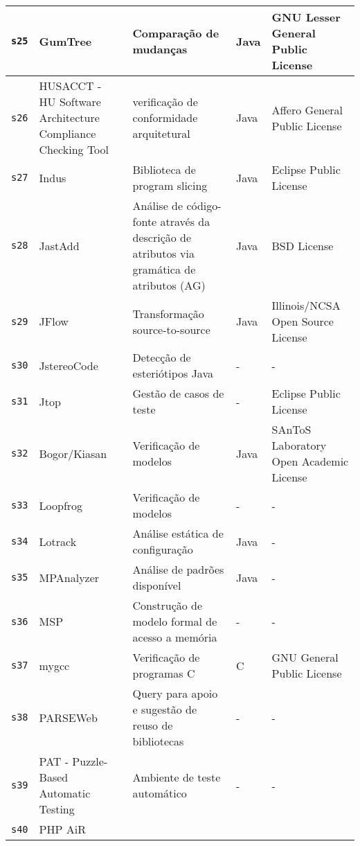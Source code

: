 \begin{longtable}{| l | p{4.5cm} | p{7cm} | p{2.5cm} | p{2.5cm} |}
    \texttt{s25} &
      GumTree &
      Comparação de mudanças &
      Java &
      GNU Lesser General Public License \\
    \hline
    \texttt{s26} &
      HUSACCT - HU Software Architecture Compliance Checking Tool &
      verificação de conformidade arquitetural &
      Java &
      Affero General Public License \\
    \hline
    \texttt{s27} &
      Indus &
      Biblioteca de program slicing &
      Java &
      Eclipse Public License \\
    \hline
    \texttt{s28} &
      JastAdd &
      Análise de código-fonte através da descrição de atributos via gramática de atributos (AG) &
      Java &
      BSD License \\
    \hline
    \texttt{s29} &
      JFlow &
      Transformação source-to-source &
      Java &
      Illinois/NCSA Open Source License \\
    \hline
    \texttt{s30} &
      JstereoCode &
      Detecção de esteriótipos Java &
      - &
      - \\
    \hline
    \texttt{s31} &
      Jtop &
      Gestão de casos de teste &
      - &
      Eclipse Public License \\
    \hline
    \texttt{s32} &
      Bogor/Kiasan &
      Verificação de modelos &
      Java &
      SAnToS Laboratory Open Academic License \\
    \hline
    \texttt{s33} &
      Loopfrog &
      Verificação de modelos &
      - &
      - \\
    \hline
    \texttt{s34} &
      Lotrack &
      Análise estática de configuração &
      Java &
      - \\
    \hline
    \texttt{s35} &
      MPAnalyzer &
      Análise de padrões disponível &
      Java &
      - \\
    \hline
    \texttt{s36} &
      MSP &
      Construção de modelo formal de acesso a memória &
      - &
      - \\
    \hline
    \texttt{s37} &
      mygcc &
      Verificação de programas C &
      C &
      GNU General Public License \\
    \hline
    \texttt{s38} &
      PARSEWeb &
      Query para apoio e sugestão de reuso de bibliotecas &
      - &
      - \\
    \hline
    \texttt{s39} &
      PAT - Puzzle-Based Automatic Testing &
      Ambiente de teste automático &
      - &
      - \\
    \hline
    \texttt{s40} &
      PHP AiR &

\end{longtable}
